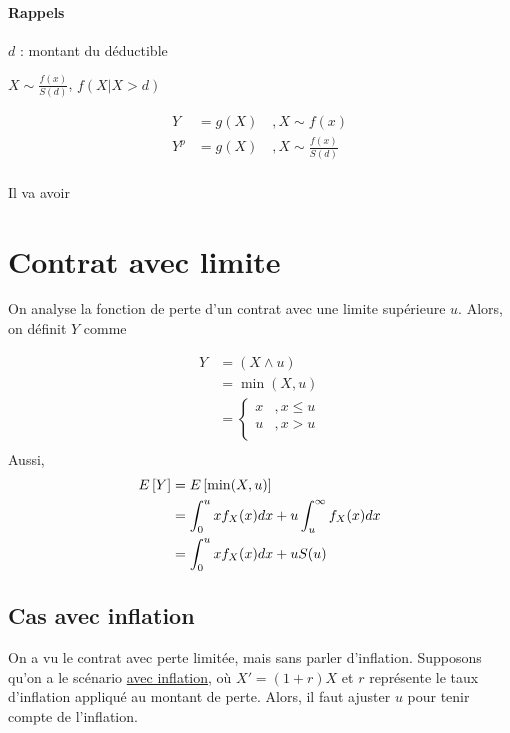 \documentclass[12pt, french]{report}
\begin{document}
\paragraph{Rappels}

$d$ : montant du déductible

$X \sim \frac{f(x)}{S(d)}$, $f(X | X > d)$

\begin{align*}
Y 	& = g(X) \quad ,X \sim f(x) \\
Y^p	& = g(X)	 \quad ,X \sim \frac{f(x)}{S(d)} \\
\end{align*}

Il va avoir

\section{Contrat avec limite}
\label{sec:limite-sans-inflation}
On analyse la fonction de perte d'un contrat avec une limite supérieure $u$. Alors, on définit $Y$ comme

\begin{align*}
Y	& = (X \wedge u) \\
	& = \min(X, u) \\
 & = 
\begin{cases}
x	& , x \leq u \\
u	& , x > u \\
\end{cases} \\
\end{align*}
Aussi,
\begin{align*}
E \left[ Y \right]	& = E \left[ \min(X,u) \right] \\
	& = \int_{0}^{u} x f_X(x) dx + u \int_{u}^{\infty} f_X(x) dx \\
	& = \int_{0}^{u} x f_X(x) dx + u S(u) \\
\end{align*}



\subsection{Cas avec inflation}
On a vu le contrat avec perte limitée, mais sans parler d'inflation. Supposons qu'on a le scénario \underline{avec inflation}, où $X' = (1+r)X$ et $r$ représente le taux d'inflation appliqué au montant de perte. Alors, il faut ajuster $u$ pour tenir compte de l'inflation.
\end{document}
